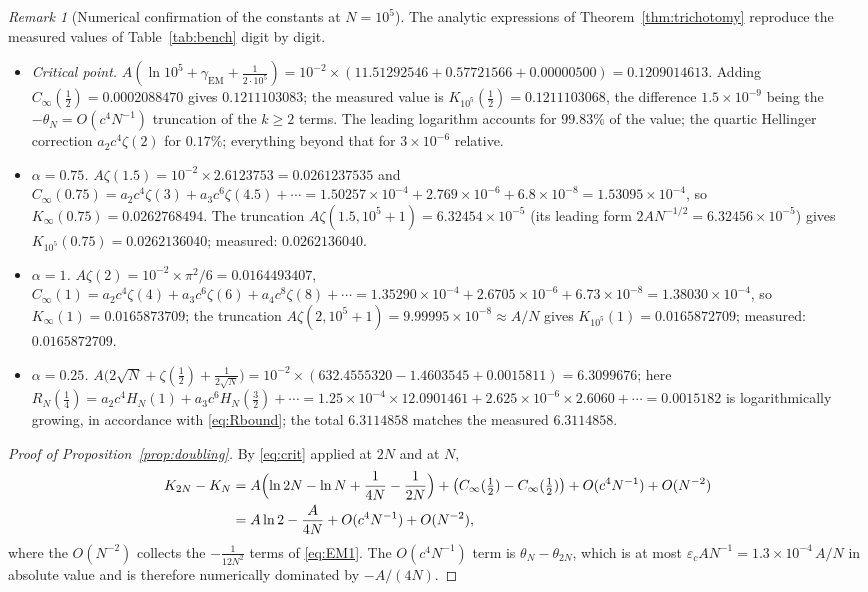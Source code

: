 \documentclass[11pt,reqno]{amsart}
\theoremstyle{plain}
\theoremstyle{definition}
\theoremstyle{remark}
\newtheorem{remark}[theorem]{Remark}
\numberwithin{equation}{section}
\begin{document}
\begin{remark}[Numerical confirmation of the constants at $N=10^5$]\label{rem:constants}
The analytic expressions of Theorem~\ref{thm:trichotomy} reproduce the measured values of Table~\ref{tab:bench} digit by digit.
\begin{itemize}[leftmargin=*]
\item \emph{Critical point.} $A(\ln10^5+\gamma_{\mathrm{EM}}+\tfrac1{2\cdot10^5})=10^{-2}\times(11.51292546+0.57721566+0.00000500)=0.1209014613$. Adding $C_\infty(\frac12)=0.0002088470$ gives $0.1211103083$; the measured value is $K_{10^5}(\frac12)=0.1211103068$, the difference $1.5\times10^{-9}$ being the $-\theta_N=O(c^4N^{-1})$ truncation of the $k\ge2$ terms. The leading logarithm accounts for $99.83\%$ of the value; the quartic Hellinger correction $a_2c^4\zeta(2)$ for $0.17\%$; everything beyond that for $3\times10^{-6}$ relative.
\item \emph{$\alpha=0.75$.} $A\zeta(1.5)=10^{-2}\times2.6123753=0.0261237535$ and $C_\infty(0.75)=a_2c^4\zeta(3)+a_3c^6\zeta(4.5)+\cdots=1.50257\times10^{-4}+2.769\times10^{-6}+6.8\times10^{-8}=1.53095\times10^{-4}$, so $K_\infty(0.75)=0.0262768494$. The truncation $A\zeta(1.5,10^5+1)=6.32454\times10^{-5}$ (its leading form $2AN^{-1/2}=6.32456\times10^{-5}$) gives $K_{10^5}(0.75)=0.0262136040$; measured: $0.0262136040$.
\item \emph{$\alpha=1$.} $A\zeta(2)=10^{-2}\times\pi^2/6=0.0164493407$, $C_\infty(1)=a_2c^4\zeta(4)+a_3c^6\zeta(6)+a_4c^8\zeta(8)+\cdots=1.35290\times10^{-4}+2.6705\times10^{-6}+6.73\times10^{-8}=1.38030\times10^{-4}$, so $K_\infty(1)=0.0165873709$; the truncation $A\zeta(2,10^5+1)=9.99995\times10^{-8}\approx A/N$ gives $K_{10^5}(1)=0.0165872709$; measured: $0.0165872709$.
\item \emph{$\alpha=0.25$.} $A\bigl(2\sqrt N+\zeta(\frac12)+\frac1{2\sqrt N}\bigr)=10^{-2}\times(632.4555320-1.4603545+0.0015811)=6.3099676$; here $R_N(\frac14)=a_2c^4H_N(1)+a_3c^6H_N(\frac32)+\cdots=1.25\times10^{-4}\times12.0901461+2.625\times10^{-6}\times2.6060+\cdots=0.0015182$ is logarithmically growing, in accordance with \eqref{eq:Rbound}; the total $6.3114858$ matches the measured $6.3114858$.
\end{itemize}
\end{remark}

\begin{proof}[Proof of Proposition~\ref{prop:doubling}]
By \eqref{eq:crit} applied at $2N$ and at $N$,
\begin{align*}
K_{2N}-K_N&=A\Bigl(\ln2N-\ln N+\frac1{4N}-\frac1{2N}\Bigr)+\bigl(C_\infty(\tfrac12)-C_\infty(\tfrac12)\bigr)+O(c^4N^{-1})+O(N^{-2})\\
&=A\ln2-\frac A{4N}+O(c^4N^{-1})+O(N^{-2}),
\end{align*}
where the $O(N^{-2})$ collects the $-\frac1{12N^2}$ terms of \eqref{eq:EM1}. The $O(c^4N^{-1})$ term is $\theta_N-\theta_{2N}$, which is at most $\varepsilon_cAN^{-1}=1.3\times10^{-4}\,A/N$ in absolute value and is therefore numerically dominated by $-A/(4N)$.
\end{proof}
\end{document}
